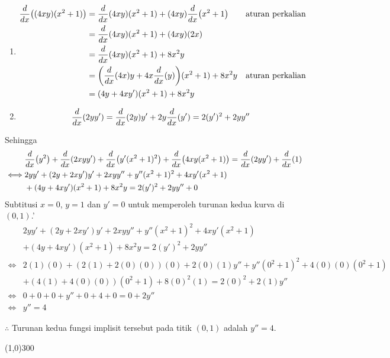 \begin{enumerate}[leftmargin=*, label={\arabic*}.]
\begin{enumerate}[label={\alph*}.]
\begin{enumerate}[label={\arabic*})]
        \item 
        \begin{align*}
            \drv{x}{(4xy)(x^{2}+1)}
            &=\drv{x}{4xy}(x^{2}+1) + (4xy)\drv{x}{x^{2}+1}
            &\text{aturan perkalian}\\
            &=\drv{x}{4xy}(x^{2}+1) + (4xy)(2x)\\
            &=\drv{x}{4xy}(x^{2}+1) + 8x^{2}y\\
            &=\brk*{\drv{x}{4x}y+4x\drv{x}{y}}(x^{2}+1)+8x^{2}y
            &\text{aturan perkalian}\\
            &=(4y+4xy')(x^{2}+1)+8x^{2}y
        \end{align*}
        \item
        \begin{align*}
            \drv{x}{2yy'} = \drv{x}{2y}y' + 2y\drv{x}{y'} = 2(y')^2+2yy''            
        \end{align*}
        \end{enumerate}
    Sehingga
    \begin{align*}
        &\drv{x}{y^{2}}+\drv{x}{2xyy'}+\drv{x}{y'(x^{2}+1)^{2}}+\drv{x}{4xy(x^{2}+1)}
        =\drv{x}{2yy'}+\drv{x}{1}\\
        \iff &2yy' + (2y+2xy')y'+2xyy''+y''(x^{2}+1)^{2}+4xy'(x^{2}+1)\\
        &+(4y+4xy')(x^{2}+1)+8x^{2}y = 2(y')^2+2yy'' + 0
    \end{align*}
    Subtitusi $x=0$, $y=1$ dan $y'=0$ untuk memperoleh turunan kedua kurva di $(0,1)$.'
    \begin{align*}
        &2yy' + (2y+2xy')y'+2xyy''+y''(x^{2}+1)^{2}+4xy'(x^{2}+1)\\
        &+(4y+4xy')(x^{2}+1)+8x^{2}y = 2(y')^2+2yy''\\
        \iff &2(1)(0) + (2(1)+2(0)(0))(0)+2(0)(1)y''+y''(0^{2}+1)^{2}+4(0)(0)(0^{2}+1)\\
        &+(4(1)+4(0)(0))(0^{2}+1)+8(0)^{2}(1) = 2(0)^2+2(1)y''\\
        \iff &0+0+0+y''+0+4+0=0+2y''\\
        \iff &y'' = 4
    \end{align*}

    $\therefore$ Turunan kedua fungsi implisit tersebut pada titik $(0,1)$ adalah $y''=4$.
    
    \end{enumerate}

\begin{center}\line(1,0){300}\end{center}



\end{enumerate}
